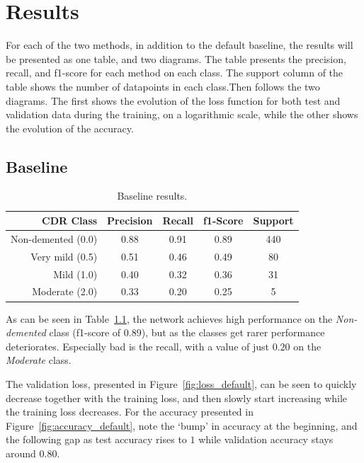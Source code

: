 \documentclass{kththesis}
\begin{document}
\chapter{Results}

For each of the two methods, in addition to the default baseline, the results will be presented as one table, and two diagrams. The table presents the precision, recall, and f1-score for each method on each class. The support column of the table shows the number of datapoints in each class.Then follows the two diagrams. The first shows the evolution of the loss function for both test and validation data during the training, on a logarithmic scale, while the other shows the evolution of the accuracy.

\section{Baseline}
\begin{table}[H]
  \begin{center}
    \caption{Baseline results. \label{tab:results_default}}
    \begin{tabular}{r|ccc|c}
      \textbf{CDR Class} & \textbf{Precision} & \textbf{Recall} & \textbf{f1-Score} & \textbf{Support} \\
      \toprule
      Non-demented (0.0) & 0.88 & 0.91 & 0.89 & 440 \\
      Very mild (0.5) & 0.51 & 0.46 & 0.49 & 80  \\
      Mild (1.0)         & 0.40 & 0.32 & 0.36 & 31  \\
      Moderate (2.0)     & 0.33 & 0.20 & 0.25 & 5   \\
    \end{tabular}
  \end{center}
\end{table}

As can be seen in Table~\ref{tab:results_default}, the network achieves high performance on the \textit{Non-demented} class (f1-score of 0.89), but as the classes get rarer performance deteriorates. Especially bad is the recall, with a value of just $0.20$ on the \textit{Moderate} class.

The validation loss, presented in Figure~\ref{fig:loss_default}, can be seen to quickly decrease together with the training loss, and then slowly start increasing while the training loss decreases. For the accuracy presented in Figure~\ref{fig:accuracy_default}, note the `bump' in accuracy at the beginning, and the following gap as test accuracy rises to $1$ while validation accuracy stays around $0.80$.
\end{document}
